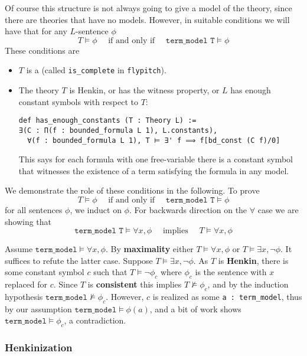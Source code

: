Of course this structure is not always going to give a model of the
theory, since there are theories that have no models.
However, in suitable conditions we will have that for any $L$-sentence $\phi$
\[
  T \vDash \phi \quad \text{ if and only if } \quad
  \texttt{term\_model T} \vDash \phi
\]
These conditions are
\begin{itemize}
  \item $T$ is a 
        (called \texttt{is\_complete} in \texttt{flypitch}).
  \item The theory $T$ is Henkin, or has the witness property,
        or $L$ has enough constant symbols with respect to $T$:
\begin{lstlisting}
def has_enough_constants (T : Theory L) :=
∃(C : Π(f : bounded_formula L 1), L.constants),
  ∀(f : bounded_formula L 1), T ⊨ ∃' f ⟹ f[bd_const (C f)/0] \end{lstlisting}
        This says for each formula with one free-variable
        there is a constant symbol that witnesses the
        existence of a term satisfying the formula in any model.
\end{itemize}

We demonstrate the role of these conditions in the following.
To prove
\[ T \vDash \phi \quad \text{ if and only if } \quad
  \texttt{term\_model T} \vDash \phi \]
for all sentences $\phi$, we induct on $\phi$.
For backwards direction on the $\forall$ case
we are showing that
\[ \texttt{term\_model T} \vDash \forall x, \phi \quad \text{ implies }
  \quad T \vDash \forall x, \phi \]

Assume $\texttt{term\_model} \vDash \forall x, \phi$.
By \textbf{maximality} either $T \vDash \forall x, \phi$ or
$T \vDash \exists x, \neg \phi$.
It suffices to refute the latter case.
Suppose $T \vDash \exists x, \neg \phi$.
As $T$ is \textbf{Henkin},
there is some constant symbol $c$ such that $T \vDash \neg \phi_{c}$
where $\phi_{c}$ is the sentence with $x$ replaced for $c$.
Since $T$ is \textbf{consistent} this implies $T \nvDash \phi_{c}$,
and by the induction hypothesis $\texttt{term\_model} \nvDash \phi_{c}$.
However, $c$ is realized as some \texttt{a : term\_model},
thus by our assumption $\texttt{term\_model} \vDash \phi(a)$,
and a bit of work shows $\texttt{term\_model} \vDash \phi_{c}$,
a contradiction.

\subsubsection{Henkinization}

